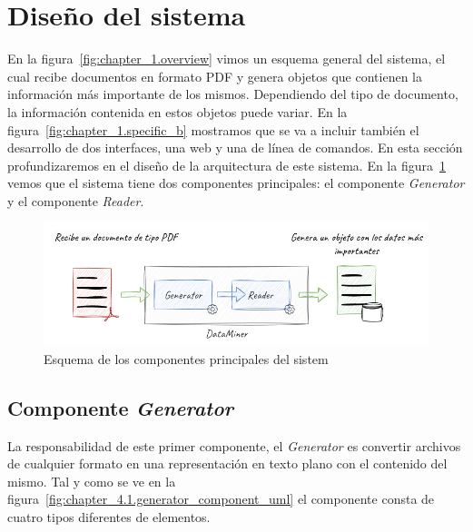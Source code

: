 \section{Diseño del sistema}\label{sec:diseno_del_sistema}

En la figura~\ref{fig:chapter_1.overview} vimos un esquema general del sistema, el cual recibe documentos en formato
PDF y genera objetos que contienen la información más importante de los mismos.
Dependiendo del tipo de documento, la información contenida en estos objetos puede variar.
En la figura~\ref{fig:chapter_1.specific_b} mostramos que se va a incluir también el desarrollo de dos interfaces, una
web y una de línea de comandos.
En esta sección profundizaremos en el diseño de la arquitectura de este sistema.
En la figura~\ref{fig:chapter_4.1.overview} vemos que el sistema tiene dos componentes principales: el componente
\textit{Generator} y el componente \textit{Reader}.

\begin{figure}[ht]
    \begin{center}
        \includegraphics[width=\textwidth]{./chapter/4/images/chapter_4.1.overview}
        \caption{Esquema de los componentes principales del sistem}
        \label{fig:chapter_4.1.overview}
    \end{center}
\end{figure}

\subsection*{Componente \textit{Generator}}\label{subsec:chapter_4.generator_component}

La responsabilidad de este primer componente, el \textit{Generator} es convertir archivos de cualquier formato en una
representación en texto plano con el contenido del mismo.
Tal y como se ve en la figura~\ref{fig:chapter_4.1.generator_component_uml} el componente consta de cuatro tipos
diferentes de elementos.

